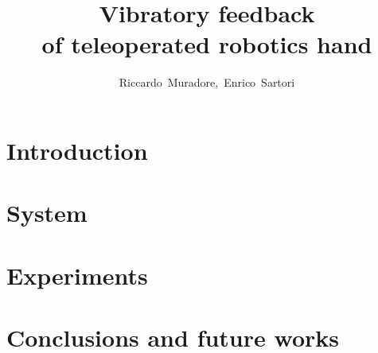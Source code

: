 \documentclass[10pt,journal,compsoc]{IEEEtran}
\begin{document}
\title{Vibratory feedback \\of teleoperated robotics hand}

\author{Riccardo~Muradore,~Enrico~Sartori}




\maketitle

\IEEEdisplaynontitleabstractindextext

\IEEEpeerreviewmaketitle


\section{Introduction}
\label{sec:introduction}



\section{System}
\label{sec:system}



\section{Experiments}
\label{sec:experiments}



\section{Conclusions and future works}
\label{sec:experiments}




\end{document}
